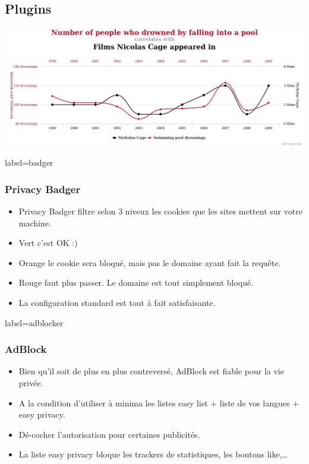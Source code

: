 \documentclass{beamer}
\begin{document}
          \subsection{Plugins}
              \begin{frame}
                  \begin{center}
                      \includegraphics[scale=0.15]{img/data_science.jpg}
                  \end{center}
              \end{frame}
              \begin{frame}{label=badger}
                  \frametitle{Privacy Badger}
                  \begin{center}
                      \begin{itemize}
                          \item Privacy Badger filtre selon 3 niveux les cookies que les sites mettent sur votre machine.
                          \item Vert c'est OK :)
                          \item Orange le cookie sera bloqué, mais pas le domaine ayant fait la requête.
                          \item Rouge faut plus passer. Le domaine est tout simplement bloqué.
                          \item La configuration standard est tout à fait satisfaisante.
                      \end{itemize}
                  \end{center}
              \end{frame}
              \begin{frame}{label=adblocker}
                  \frametitle{AdBlock}
                  \begin{center}
                      \begin{itemize}
                          \item Bien qu'il soit de plus en plus contreversé, AdBlock est fiable pour la vie privée.
                          \item A la condition d'utiliser à minima les listes easy list + liste de vos langues + easy privacy.
                          \item Dé-cocher l'autorisation pour certaines publicités.
                          \item La liste easy privacy bloque les trackers de statistiques, les boutons like,\ldots
                      \end{itemize}
                  \end{center}
              \end{frame}
\end{document}
